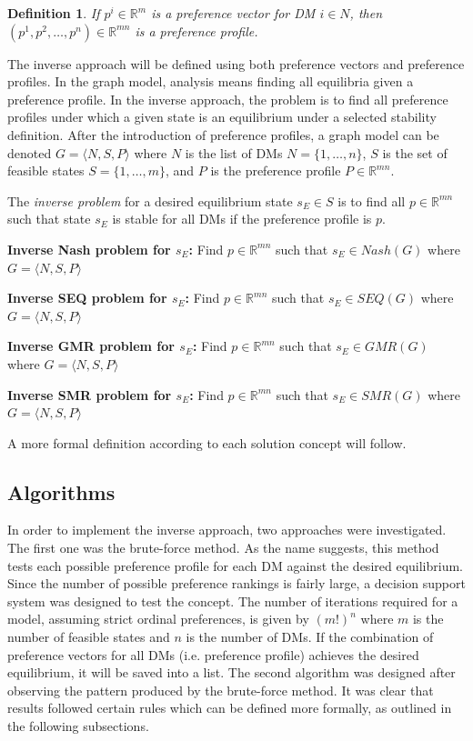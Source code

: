 \documentclass[letterpaper,12pt,titlepage,oneside,final]{book}
\newtheorem{definition}[lemma]{Definition}
\begin{document}
\begin{definition}
\rm
If $p^i \in \mathbb{R}^m$ is a preference vector for DM $i \in N$, then $(p^1,p^2,\dots ,p^n) \in \mathbb{R}^{mn}$ is a preference profile.

\end{definition}


The inverse approach will be defined using both preference vectors and preference profiles. In the graph model, analysis means finding all equilibria given a preference profile. In the inverse approach, the problem is to find all preference profiles under which a given state is an equilibrium under a selected stability definition.  After the introduction of preference profiles, a graph model can be denoted $G=\langle N,S,P\rangle$ where $N$ is the list of DMs $N=\{1,\dots ,n\}$, $S$ is the set of feasible states $S=\{1,\dots ,m\}$, and $P$ is the preference profile $P \in \mathbb{R}^{mn}$.

The \emph{inverse problem} for a desired equilibrium state $s_E \in S$ is to find all $p \in \mathbb{R}^{mn}$ such that state $s_E$ is stable for all DMs if the preference profile is $p$.


\noindent \textbf{Inverse Nash problem for $s_E$:} Find $p \in \mathbb{R}^{mn}$ such that $s_E \in Nash(G)$ where $G=\langle N,S,P\rangle $

\noindent \textbf{Inverse SEQ problem for $s_E$:} Find $p \in \mathbb{R}^{mn}$ such that $s_E \in SEQ(G)$ where $G=\langle N,S,P\rangle $

\noindent \textbf{Inverse GMR problem for $s_E$:} Find $p \in \mathbb{R}^{mn}$ such that $s_E \in GMR(G)$ where $G=\langle N,S,P\rangle $

\noindent \textbf{Inverse SMR problem for $s_E$:} Find $p \in \mathbb{R}^{mn}$ such that $s_E \in SMR(G)$ where $G=\langle N,S,P\rangle $

A more formal definition according to each solution concept will follow.


\subsection{Algorithms}

In order to implement the inverse approach, two approaches were investigated. The first one was the brute-force method. As the name suggests, this method tests each possible preference profile for each DM against the desired equilibrium. Since the number of possible preference rankings is fairly large, a decision support system was designed to test the concept. The number of iterations required for a model, assuming strict ordinal preferences, is given by $(m!)^{n}$ where $m$ is the number of feasible states and $n$ is the number of DMs.  If the combination of preference vectors for all DMs (i.e. preference profile) achieves the desired equilibrium, it will be saved into a list. The second algorithm was designed after observing the pattern produced by the brute-force method. It was clear that results followed certain rules which can be defined more formally, as outlined in the following subsections. %
\end{document}
